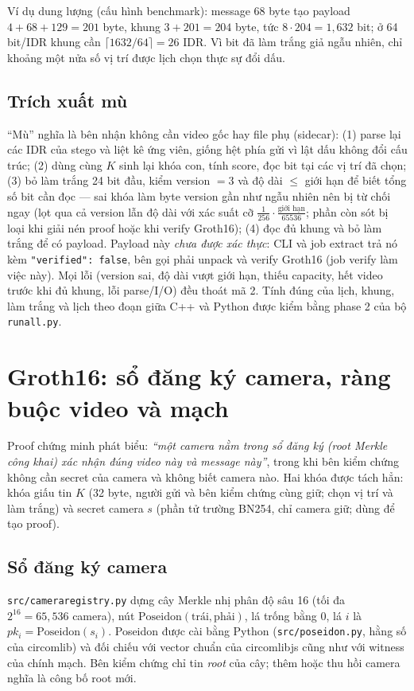 \documentclass[11pt,a4paper]{article}
\renewcommand{\_}{\origunderscore\allowbreak}
\begin{document}
Ví dụ dung lượng (cấu hình benchmark): message 68 byte tạo payload $4+68+129=201$ byte, khung $3+201=204$ byte, tức $8\cdot204=1{,}632$ bit; ở 64 bit/IDR khung cần $\lceil1632/64\rceil=26$ IDR. Vì bit đã làm trắng giả ngẫu nhiên, chỉ khoảng một nửa số vị trí được lịch chọn thực sự đổi dấu.

\subsection{Trích xuất mù}
``Mù'' nghĩa là bên nhận không cần video gốc hay file phụ (sidecar): (1) parse lại các IDR của stego và liệt kê ứng viên, giống hệt phía gửi vì lật dấu không đổi cấu trúc; (2) dùng cùng $K$ sinh lại khóa con, tính score, đọc bit tại các vị trí đã chọn; (3) bỏ làm trắng 24 bit đầu, kiểm version $=3$ và độ dài $\le$ giới hạn để biết tổng số bit cần đọc --- sai khóa làm byte version gần như ngẫu nhiên nên bị từ chối ngay (lọt qua cả version lẫn độ dài với xác suất cỡ $\tfrac{1}{256}\cdot\tfrac{\text{giới hạn}}{65536}$; phần còn sót bị loại khi giải nén proof hoặc khi verify Groth16); (4) đọc đủ khung và bỏ làm trắng để có payload. Payload này \emph{chưa được xác thực}: CLI và job extract trả nó kèm \texttt{"verified": false}, bên gọi phải unpack và verify Groth16 (job verify làm việc này). Mọi lỗi (version sai, độ dài vượt giới hạn, thiếu capacity, hết video trước khi đủ khung, lỗi parse/I/O) đều thoát mã 2. Tính đúng của lịch, khung, làm trắng và lịch theo đoạn giữa C++ và Python được kiểm bằng phase 2 của bộ \texttt{run\_all.py}.

\section{Groth16: sổ đăng ký camera, ràng buộc video và mạch}\label{sec:groth16}
Proof chứng minh phát biểu: \emph{``một camera nằm trong sổ đăng ký (root Merkle công khai) xác nhận đúng video này và message này''}, trong khi bên kiểm chứng không cần secret của camera và không biết camera nào. Hai khóa được tách hẳn: khóa giấu tin $K$ (32 byte, người gửi và bên kiểm chứng cùng giữ; chọn vị trí và làm trắng) và secret camera $s$ (phần tử trường BN254, chỉ camera giữ; dùng để tạo proof).

\subsection{Sổ đăng ký camera}
\texttt{src/camera\_registry.py} dựng cây Merkle nhị phân độ sâu 16 (tối đa $2^{16}=65{,}536$ camera), nút $\mathrm{Poseidon}(\text{trái},\text{phải})$, lá trống bằng 0, lá $i$ là $pk_i=\mathrm{Poseidon}(s_i)$. Poseidon được cài bằng Python (\texttt{src/poseidon.py}, hằng số của circomlib) và đối chiếu với vector chuẩn của circomlibjs cũng như với witness của chính mạch. Bên kiểm chứng chỉ tin \emph{root} của cây; thêm hoặc thu hồi camera nghĩa là công bố root mới.
\end{document}
